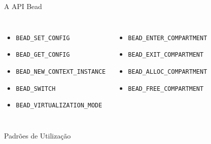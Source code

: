 \documentclass[xcolor={usenames,svgnames,dvipsnames},brazil,english,12pt,aspectratio=149]{beamer}
\newcommand\col{\column{.5\textwidth}}
\begin{document}
\begin{frame}{A API Bead}
  \begin{columns}[t]
    \col
      \begin{itemize}
        \item \texttt{BEAD\_SET\_CONFIG}
        \item \texttt{BEAD\_GET\_CONFIG}
        \item \texttt{BEAD\_NEW\_CONTEXT\_INSTANCE}
        \item \texttt{BEAD\_SWITCH}
        \item \texttt{BEAD\_VIRTUALIZATION\_MODE}
      \end{itemize}
    \col
      \begin{itemize}
        \item \texttt{BEAD\_ENTER\_COMPARTMENT}
        \item \texttt{BEAD\_EXIT\_COMPARTMENT}
        \item \texttt{BEAD\_ALLOC\_COMPARTMENT}
        \item \texttt{BEAD\_FREE\_COMPARTMENT}
      \end{itemize}
  \end{columns}
\end{frame}

\begin{frame}{Padrões de Utilização}
\end{frame}
\end{document}
